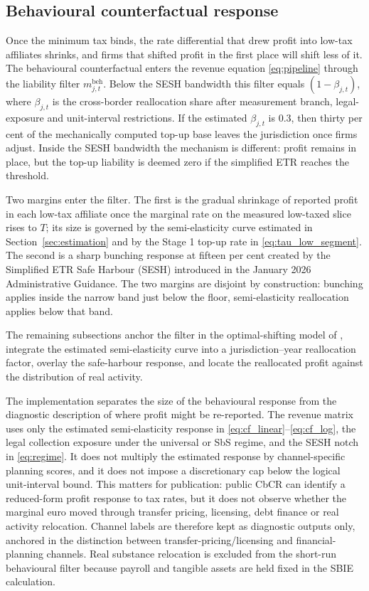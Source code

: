 \documentclass[11pt,a4paper]{article}
\begin{document}
\subsection{Behavioural counterfactual response}\label{sec:behavioural}

Once the minimum tax binds, the rate differential that drew profit into low-tax affiliates shrinks, and firms that shifted profit in the first place will shift less of it. The behavioural counterfactual enters the revenue equation \eqref{eq:pipeline} through the liability filter $m_{j,t}^{\text{beh}}$. Below the SESH bandwidth this filter equals $(1-\beta_{j,t})$, where $\beta_{j,t}$ is the cross-border reallocation share after measurement branch, legal-exposure and unit-interval restrictions. If the estimated $\beta_{j,t}$ is 0.3, then thirty per cent of the mechanically computed top-up base leaves the jurisdiction once firms adjust. Inside the SESH bandwidth the mechanism is different: profit remains in place, but the top-up liability is deemed zero if the simplified ETR reaches the threshold.

Two margins enter the filter. The first is the gradual shrinkage of reported profit in each low-tax affiliate once the marginal rate on the measured low-taxed slice rises to $T$; its size is governed by the semi-elasticity curve estimated in Section~\ref{sec:estimation} and by the Stage 1 top-up rate in \eqref{eq:tau_low_segment}. The second is a sharp bunching response at fifteen per cent created by the Simplified ETR Safe Harbour (SESH) introduced in the January 2026 Administrative Guidance. The two margins are disjoint by construction: bunching applies inside the narrow band just below the floor, semi-elasticity reallocation applies below that band.

The remaining subsections anchor the filter in the optimal-shifting model of \citet{johannesen2022}, integrate the estimated semi-elasticity curve into a jurisdiction--year reallocation factor, overlay the safe-harbour response, and locate the reallocated profit against the distribution of real activity.

The implementation separates the size of the behavioural response from the diagnostic description of where profit might be re-reported. The revenue matrix uses only the estimated semi-elasticity response in \eqref{eq:cf_linear}--\eqref{eq:cf_log}, the legal collection exposure under the universal or SbS regime, and the SESH notch in \eqref{eq:regime}. It does not multiply the estimated response by channel-specific planning scores, and it does not impose a discretionary cap below the logical unit-interval bound. This matters for publication: public CbCR can identify a reduced-form profit response to tax rates, but it does not observe whether the marginal euro moved through transfer pricing, licensing, debt finance or real activity relocation. Channel labels are therefore kept as diagnostic outputs only, anchored in the \citet{heckemeyer2017} distinction between transfer-pricing/licensing and financial-planning channels. Real substance relocation is excluded from the short-run behavioural filter because payroll and tangible assets are held fixed in the SBIE calculation.
\end{document}

